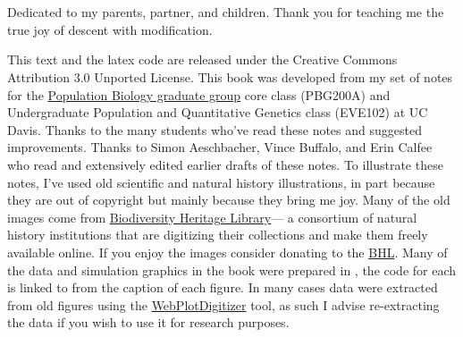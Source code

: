 \documentclass{tufte-book}
\begin{document}
\begin{fullwidth}
~\vfill
\thispagestyle{empty}

~\vfill
\begin{doublespace}
\noindent\fontsize{16}{18}\selectfont\itshape   %
\nohyphenation
\begin{center}
Dedicated to my parents, partner, and children. Thank you for teaching me the
true joy of descent with modification.
\end{center}
\end{doublespace}
\vfill
\vfill

\setlength{\parindent}{0pt}
\setlength{\parskip}{\baselineskip}
  \small This text and the latex code are released under the
  Creative Commons Attribution 3.0 Unported License. This book was developed from my set of notes for the \href{http://www-eve.ucdavis.edu/eve/pbg/}{Population
  Biology graduate group} core class (PBG200A) and Undergraduate Population and
  Quantitative Genetics class (EVE102) at UC Davis. Thanks to the many
  students who've read these notes and suggested improvements. Thanks
 to Simon Aeschbacher, Vince Buffalo, and Erin Calfee who read
 and extensively edited earlier drafts of these notes. To illustrate these notes, I've used old scientific and natural history illustrations, in part
 because they are out of copyright but mainly because they bring me
 joy. Many of the old images come from
 \href{https://www.biodiversitylibrary.org/}{Biodiversity Heritage
   Library}--- a consortium of natural history institutions that are
 digitizing their collections and make them freely available
 online. If you enjoy the images consider donating to the
 \href{http://library.si.edu/donate-bhl}{BHL}. Many of the data and
 simulation graphics in the book were prepared in \citet{Rstats},
 the code for each is linked to from the caption of each figure. In many cases
 data were extracted from old figures using the
 \href{https://automeris.io/WebPlotDigitizer/}{WebPlotDigitizer}
 tool, as such I advise re-extracting the data if you wish to use it
 for research purposes.
\end{fullwidth}

\tableofcontents


















%


\end{document}
